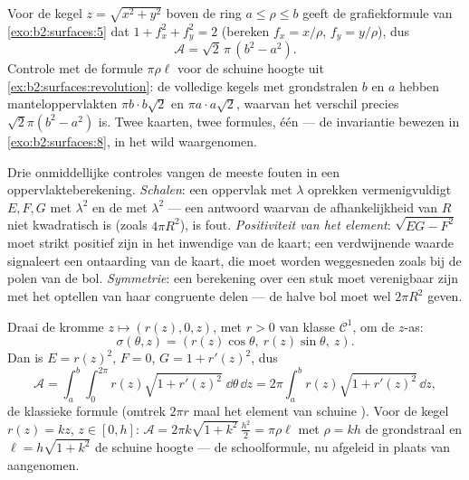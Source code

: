 \begin{example}\label{ex:b2:surfaces:conearea}
Voor de kegel $z = \sqrt{x^2 + y^2}$ boven de ring $a \leq \rho
\leq b$ geeft de grafiekformule van \cref{exo:b2:surfaces:5} dat $1
+ f_x^2 + f_y^2 = 2$ (bereken $f_x = x/\rho$, $f_y = y/\rho$), dus
\[
\mathcal A = \sqrt2\,\pi\,(b^2 - a^2) .
\]
Controle met de formule $\pi\rho\ell$ voor de schuine hoogte uit
\cref{ex:b2:surfaces:revolution}: de volledige kegels met
grondstralen $b$ en $a$ hebben manteloppervlakten $\pi b\cdot
b\sqrt2$ en $\pi a\cdot a\sqrt2$, waarvan het verschil precies
$\sqrt2\pi(b^2 - a^2)$ is. Twee kaarten, twee formules, één
 --- de invariantie bewezen in
\cref{exo:b2:surfaces:8}, in het wild waargenomen.
\end{example}

\begin{remark}
Drie onmiddellijke controles vangen de meeste fouten in een
oppervlakteberekening. \emph{Schalen}: een oppervlak met $\lambda$
oprekken vermenigvuldigt $E, F, G$ met $\lambda^2$ en de
 met $\lambda^2$ --- een antwoord waarvan de afhankelijkheid
van $R$ niet kwadratisch is (zoals $4\pi R^2$), is fout.
\emph{Positiviteit van het element}: $\sqrt{EG - F^2}$ moet strikt
positief zijn in het inwendige van de kaart; een verdwijnende
waarde signaleert een ontaarding van de kaart, die moet worden
weggesneden zoals bij de polen van de bol. \emph{Symmetrie}: een
berekening over een  stuk moet verenigbaar zijn met het
optellen van haar congruente delen --- de halve bol moet wel
$2\pi R^2$ geven.
\end{remark}

\begin{example}[Omwentelingsoppervlak]\label{ex:b2:surfaces:revolution}
Draai de kromme $z \mapsto (r(z), 0, z)$, met $r > 0$ van klasse
$\mathcal{C}^1$, om de $z$-as:
\[
\sigma(\theta, z) = (r(z)\cos\theta,\ r(z)\sin\theta,\ z).
\]
Dan is $E = r(z)^2$, $F = 0$, $G = 1 + r'(z)^2$, dus
\[
\mathcal{A} = \int_a^b\!\!\int_0^{2\pi}
r(z)\sqrt{1 + r'(z)^2}\;\dd\theta\,\dd z
= 2\pi\int_a^b r(z)\sqrt{1 + r'(z)^2}\,\dd z ,
\]
de klassieke formule (omtrek $2\pi r$ maal het element van schuine
). Voor de kegel $r(z) = kz$, $z \in [0, h]$: $\mathcal A =
2\pi k\sqrt{1 + k^2}\,\frac{h^2}{2} = \pi \rho \ell$ met $\rho =
kh$ de grondstraal en $\ell = h\sqrt{1 + k^2}$ de schuine hoogte
--- de schoolformule, nu afgeleid in plaats van aangenomen.
\end{example}

